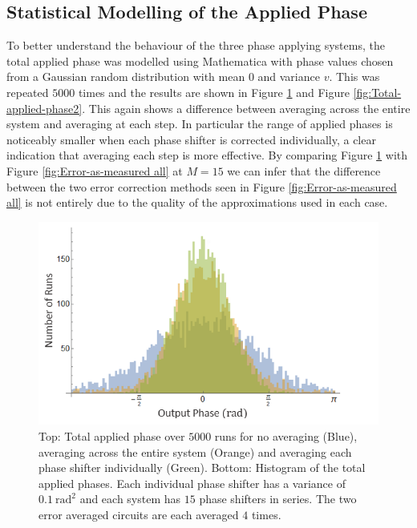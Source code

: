 \documentclass[aps,pra,twocolumn,superscriptaddress,numerical]{revtex4-1}
\begin{document}
			
		\subsection{Statistical Modelling of the Applied Phase\label{Statistical Modelling of the Applied Phase}}
			
			To better understand the behaviour of the three phase applying systems, the total applied phase was modelled using Mathematica with phase values chosen from a Gaussian random distribution with mean $0$ and variance $v$. This was repeated $5000$ times and the results are shown in Figure \ref{fig:Total-applied-phase1} and Figure \ref{fig:Total-applied-phase2}. This again shows a difference between averaging across the entire system and averaging at each step. In particular the range of applied phases is noticeably smaller when each phase shifter is corrected individually, a clear indication that averaging each step is more effective. By comparing Figure \ref{fig:Total-applied-phase1} with Figure \ref{fig:Error-as-measured all} at $M=15$ we can infer that the difference between the two error correction methods seen in Figure \ref{fig:Error-as-measured all} is not entirely due to the quality of the approximations used in each case.
			
			\begin{figure}
				\begin{centering}
					\includegraphics[width=\columnwidth]{totPhase1.png}
					\par\end{centering}
				
				\caption[Statistical simulation of total applied phase for no correction, correcting across the system and correcting each element individually for a larger system. ]{Top: Total applied phase over $5000$ runs for no averaging (Blue), averaging across the entire system (Orange) and averaging each phase shifter individually (Green). Bottom: Histogram of the total applied phases. Each individual phase shifter has a variance of $0.1\ \textrm{rad}^{2}$ and each system has $15$ phase shifters in series. The two error averaged circuits are each averaged $4$ times. \label{fig:Total-applied-phase1}}
			\end{figure}
			
\end{document}
